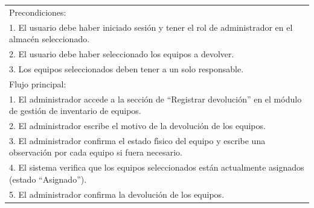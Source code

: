 \documentclass[stu, 12pt, letterpaper, donotrepeattitle, floatsintext, natbib]{apa7}
\begin{document}
\begin{longtable}{@{} p{16.5cm} @{}}
    Precondiciones:                                                                                                                                                                                                                      \\
    1. El usuario debe haber iniciado sesi\'on y tener el rol de administrador en el almac\'en seleccionado.                                                                                                                             \\
    2. El usuario debe haber seleccionado los equipos a devolver.                                                                                                                                                                        \\
    3. Los equipos seleccionados deben tener a un solo responsable.                                                                                                                                                                      \\ \midrule
    Flujo principal:                                                                                                                                                                                                                     \\
    1. El administrador accede a la secci\'on de ``Registrar devoluci\'on'' en el m\'odulo de gesti\'on de inventario de equipos.                                                                                                        \\
    2. El administrador escribe el motivo de la devoluci\'on de los equipos.                                                                                                                                                             \\
    3. El administrador confirma el estado f\'{\i}sico del equipo y escribe una observaci\'on por cada equipo si fuera necesario.                                                                                                        \\
    4. El sistema verifica que los equipos seleccionados est\'an actualmente asignados (estado ``Asignado'').                                                                                                                            \\
    5. El administrador confirma la devoluci\'on de los equipos.                                                                                                                                                                         \\

\end{longtable}
\end{document}
